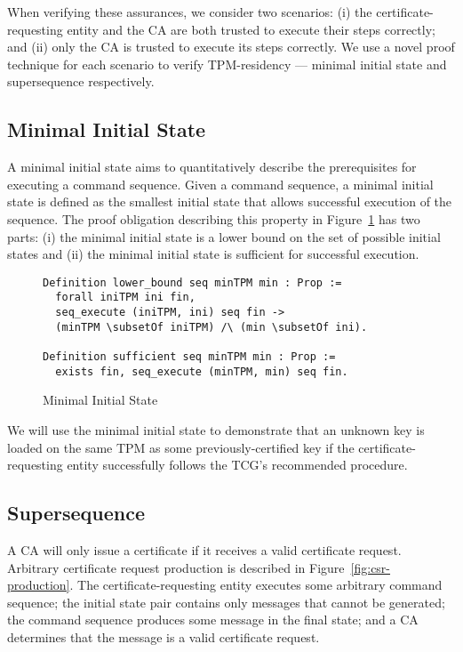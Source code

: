 \documentclass[runningheads]{llncs}
\begin{document}
When verifying these assurances, we consider two scenarios: (i) the
certificate-requesting entity and the CA are both trusted to execute
their steps correctly; and (ii) only the CA is trusted to execute its
steps correctly. We use a novel proof technique for each scenario to
verify TPM-residency --- minimal initial state and supersequence
respectively.

\subsection{Minimal Initial State}

A minimal initial state aims to quantitatively describe the
prerequisites for executing a command sequence.  Given a command
sequence, a minimal initial state is defined as the smallest initial
state that allows successful execution of the sequence. The proof
obligation describing this property in
Figure~\ref{fig:minimal-initial-state} has two parts: (i) the minimal
initial state is a lower bound on the set of possible initial states
and (ii) the minimal initial state is sufficient for successful
execution. 

\begin{figure}[hbtp]
\begin{lstlisting}[language=Coq]
Definition lower_bound seq minTPM min : Prop :=
  forall iniTPM ini fin,
  seq_execute (iniTPM, ini) seq fin ->
  (minTPM \subsetOf iniTPM) /\ (min \subsetOf ini).

Definition sufficient seq minTPM min : Prop :=
  exists fin, seq_execute (minTPM, min) seq fin.
\end{lstlisting}
\caption{Minimal Initial State}
\label{fig:minimal-initial-state}
\end{figure}

We will use the minimal initial state to demonstrate that an unknown
key is loaded on the same TPM as some previously-certified key if the
certificate-requesting entity successfully follows the TCG's
recommended procedure.

\subsection{Supersequence}

A CA will only issue a certificate if it receives a valid certificate
request.  Arbitrary certificate request production is described in
Figure~\ref{fig:csr-production}. The certificate-requesting
entity executes some arbitrary command sequence; the initial state
pair contains only messages that cannot be generated; the command
sequence produces some message in the final state; and a CA determines
that the message is a valid certificate request.
\end{document}
